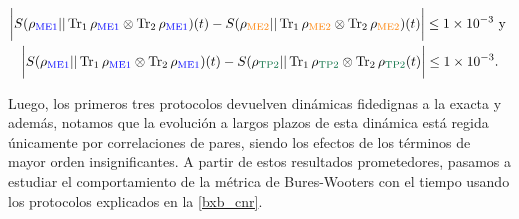 \documentclass{report} %
\numberwithin{equation}{section}
\begin{document}
\begin{gather*}
    \bigg|S(\rho_{\textnormal{\textcolor{blue}{ME1}}}|| \Tr_{1}\rho_{\textnormal{\textcolor{blue}{ME1}}} \otimes \Tr_{2}\rho_{\textnormal{\textcolor{blue}{ME1}}})(t) - S(\rho_{\textnormal{\textcolor{orange}{ME2}}}|| \Tr_{1}\rho_{\textnormal{\textcolor{orange}{ME2}}} \otimes \Tr_{2}\rho_{\textnormal{\textcolor{orange}{ME2}}})(t) \bigg| \leq 1 \times10^{-3} \textnormal{ y } \\  
    \bigg|S(\rho_{\textnormal{\textcolor{blue}{ME1}}}|| \Tr_{1}\rho_{\textnormal{\textcolor{blue}{ME1}}} \otimes \Tr_{2}\rho_{\textnormal{\textcolor{blue}{ME1}}})(t) 
    - S(\rho_{\textnormal{\textcolor{dark green}{TP2}}}|| \Tr_{1}\rho_{\textnormal{\textcolor{dark green}{TP2}}} \otimes \Tr_{2}\rho_{\textnormal{\textcolor{dark green}{TP2}}} (t) \bigg| \leq 1 \times10^{-3}.
\end{gather*}

Luego, los primeros tres protocolos devuelven dinámicas fidedignas a la exacta y además, notamos que la evolución a largos plazos de esta dinámica está regida únicamente por correlaciones de pares, siendo los efectos de los términos de mayor orden insignificantes. A partir de estos resultados prometedores, pasamos a estudiar el comportamiento de la métrica de Bures-Wooters con el tiempo usando los protocolos explicados en la \autoref{bxb_cnr}. 
\end{document}
